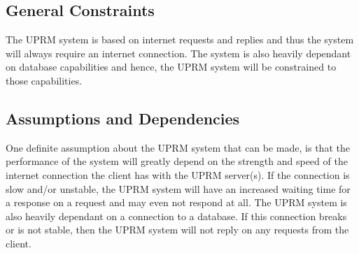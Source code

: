	\subsection{General Constraints}
		The UPRM system is based on internet requests and replies and thus the system will always require an internet connection. The system is also heavily dependant on database capabilities and hence, the UPRM system will be constrained to those capabilities.
	
	\subsection{Assumptions and Dependencies}
		One definite assumption about the UPRM system that can be made, is that the performance of the system will greatly depend on the strength and speed of the internet connection the client has with the UPRM server(s). If the connection is slow and/or unstable, the UPRM system will have an increased waiting time for a response on a request and may even not respond at all.
		The UPRM system is also heavily dependant on a connection to a database. If this connection breaks or is not stable, then the UPRM system will not reply on any requests from the client.
					